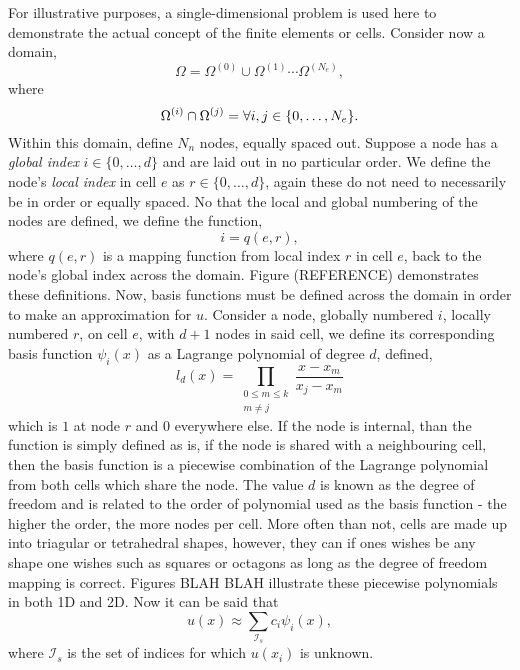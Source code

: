 For illustrative purposes, a single-dimensional problem is used here to demonstrate the actual concept of the finite elements or cells. Consider now a domain,
\begin{equation}
	\Omega = \Omega^{(0)}\cup\Omega^{(1)}\cdots\Omega^{(N_e)},
\end{equation}
where 
\begin{equation}
	\Omega^{(i)}\cap\Omega^{(j)} = \null \forall i,j \in \{0,\dots,N_e\}.
\end{equation}
Within this domain, define $N_n$ nodes, equally spaced out. Suppose a node has a \textit{global index} $i \in \{0,\dots,d\}$ and are laid out in no particular order. We define the node's \textit{local index} in cell $e$ as $r \in \{0,\dots,d\}$, again these do not need to necessarily be in order or equally spaced. No that the local and global numbering of the nodes are defined, we define the function,
\begin{equation}
	i = q(e,r),
\end{equation}
where $q(e,r)$ is a mapping function from local index $r$ in cell $e$, back to the node's global index across the domain. Figure (REFERENCE) demonstrates these definitions. Now, basis functions must be defined across the domain in order to make an approximation for $u$. Consider a node, globally numbered $i$, locally numbered $r$, on cell $e$, with $d+1$ nodes in said cell, we define its corresponding basis function $\psi_i(x)$ as a Lagrange polynomial of degree $d$, defined,
\begin{equation}
	l_d(x) = \prod_{\substack{0\leq m\leq k \\ m\neq j}}\frac{x-x_m}{x_j-x_m} 
\end{equation}
which is $1$ at node $r$ and $0$ everywhere else. If the node is internal, than the function is simply defined as is, if the node is shared with a neighbouring cell, then the basis function is a piecewise combination of the Lagrange polynomial from both cells which share the node. The value $d$ is known as the degree of freedom and is related to the order of polynomial used as the basis function - the higher the order, the more nodes per cell. More often than not, cells are made up into triagular or tetrahedral shapes, however, they can if ones wishes be any shape one wishes such as squares or octagons as long as the degree of freedom mapping is correct. Figures BLAH BLAH illustrate these piecewise polynomials in both 1D and 2D. Now it can be said that
\begin{equation}
	u(x) \approx \sum_{\mathcal{I}_s} c_i \psi_i(x),
\end{equation}
where $\mathcal{I}_s$ is the set of indices for which $u(x_i)$ is unknown.

